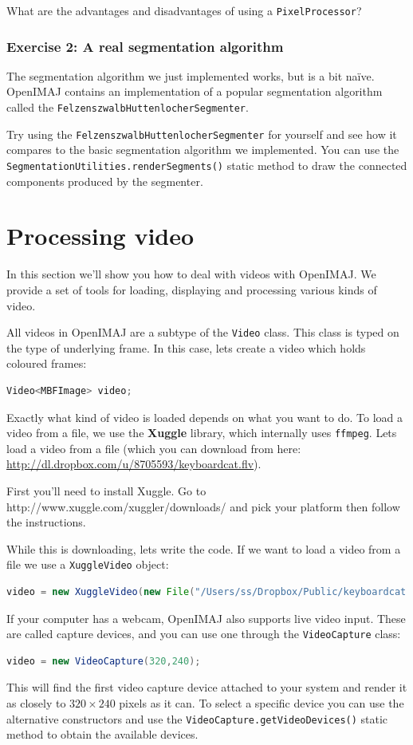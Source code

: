 \documentclass[10pt,a4paper,twoside,extrafontsizes]{memoir}
\begin{document}
What are the advantages and disadvantages of using a \verb+PixelProcessor+?

\subsection*{Exercise 2: A real segmentation algorithm}
The segmentation algorithm we just implemented works, but is a bit na\"ive. OpenIMAJ contains an 
implementation of a popular segmentation algorithm called the \verb+FelzenszwalbHuttenlocherSegmenter+. 

Try using the \verb+FelzenszwalbHuttenlocherSegmenter+ for yourself and see how it compares to the 
basic segmentation algorithm we implemented. You can use the \verb+SegmentationUtilities.renderSegments()+ 
static method to draw the connected components produced by the segmenter.

\chapter{Processing video}
In this section we'll show you how to deal with videos with OpenIMAJ. We provide a 
set of tools for loading, displaying and processing various kinds of video. 

All videos in OpenIMAJ are a subtype of the \verb+Video+ class. This class is typed 
on the type of underlying frame. In this case, lets create a video which holds coloured frames:
\begin{lstlisting}[language=java]
Video<MBFImage> video;
\end{lstlisting}

Exactly what kind of video is loaded depends on what you want to do. To load a video from a file, 
we use the \textbf{Xuggle} library, which internally uses \verb+ffmpeg+. Lets load a video 
from a file (which you can download from here: \url{http://dl.dropbox.com/u/8705593/keyboardcat.flv}).

First you'll need to install Xuggle. Go to http://www.xuggle.com/xuggler/downloads/ and pick your platform 
then follow the instructions.

While this is downloading, lets write the code. If we want to load a video from a file we use a 
\verb+XuggleVideo+ object:
\begin{lstlisting}[language=java]
video = new XuggleVideo(new File("/Users/ss/Dropbox/Public/keyboardcat.flv"));
\end{lstlisting}

If your computer has a webcam, OpenIMAJ also supports live video input. These are called capture 
devices, and you can use one through the \verb+VideoCapture+ class:
\begin{lstlisting}[language=java]
video = new VideoCapture(320,240);
\end{lstlisting}
This will find the first video capture device attached to your system and render it as closely to 
$320\times240$ pixels as it can. To select a specific device you can use the alternative constructors
and use the \verb+VideoCapture.getVideoDevices()+ static method to obtain the available devices.
\end{document}
